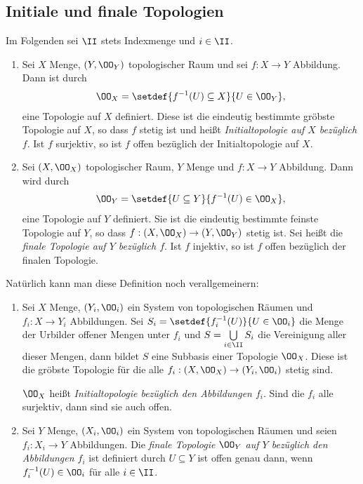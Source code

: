 \subsection{Initiale und finale Topologien}

Im Folgenden sei $\II$ stets Indexmenge und $i\in\II$.

\begin{defn}
\label{defn:1.3.1}
\begin{enumerate}
  \item Sei $X$ Menge, $(Y,\OO_Y)$ topologischer Raum und sei $f: X\to Y$
  Abbildung. Dann ist durch
  \begin{align*}
  \OO_X = \setdef{f^{-1}(U)\subseteq X}{U\in \OO_Y},
  \end{align*}
  eine Topologie auf $X$ definiert. Diese ist die eindeutig bestimmte gröbste
  Topologie auf $X$, so dass $f$ stetig ist und heißt \emph{Initialtopologie
  auf $X$ bezüglich $f$}. Ist $f$ surjektiv, so ist $f$ offen bezüglich der
  Initialtopologie auf $X$.
  \item Sei $(X,\OO_X)$ topologischer Raum, $Y$ Menge und $f: X\to Y$ Abbildung.
  Dann wird durch
\begin{align*}
\OO_Y = \setdef{U\subseteq Y}{f^{-1}(U)\in\OO_X},
\end{align*}
 eine Topologie auf $Y$ definiert. Sie ist die eindeutig bestimmte feinste
 Topologie auf $Y$, so dass $f: (X,\OO_X)\to (Y,\OO_Y)$ stetig ist. Sei heißt die
  \emph{finale Topologie auf $Y$ bezüglich $f$}. Ist $f$ injektiv, so ist $f$
  offen bezüglich der finalen Topologie.\fishhere
\end{enumerate}
\end{defn}

Natürlich kann man diese Definition noch verallgemeinern:

\begin{defn}
\label{defn:1.3.2}
\begin{enumerate}
  \item Sei $X$ Menge, $(Y_i, \OO_i)$ ein System von topologischen
  Räumen und $f_i: X\to Y_i$ Abbildungen. Sei
  $S_i = \setdef{f_i^{-1}(U)}{U\in\OO_i}$ die Menge der Urbilder offener Mengen
  unter $f_i$ und $S = \bigcup\limits_{i\in\II} S_i$ die Vereinigung aller 
  dieser Mengen, dann bildet $S$ eine Subbasis einer Topologie $\OO_X$. Diese
  ist die gröbste Topologie für die alle $f_i : (X,\OO_X)\to (Y_{i}, \OO_i)$
  stetig sind.
  
  $\OO_X$ heißt \emph{Initialtopologie bezüglich den Abbildungen $f_i$}. Sind
  die $f_i$ alle surjektiv, dann sind sie auch offen.
  \item Sei $Y$ Menge, $(X_i,\OO_i)$ ein System von topologischen
  Räumen und seien $f_i: X_i\to Y$ Abbildungen. Die \emph{finale Topologie
  $\OO_Y$ auf $Y$ bezüglich den Abbildungen $f_i$} ist definiert durch
  $U\subseteq Y$ ist offen genau dann, wenn $f_i^{-1}(U)\in\OO_i$ für alle
  $i\in\II$.\fishhere
\end{enumerate}
\end{defn}

